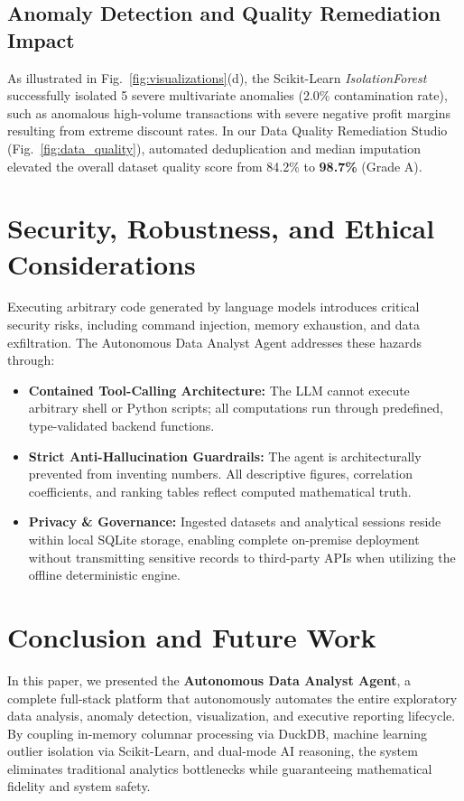\documentclass[10pt,journal,compsoc]{IEEEtran}
\begin{document}
\subsection{Anomaly Detection and Quality Remediation Impact}
As illustrated in Fig.~\ref{fig:visualizations}(d), the Scikit-Learn \textit{IsolationForest} successfully isolated 5 severe multivariate anomalies (2.0\% contamination rate), such as anomalous high-volume transactions with severe negative profit margins resulting from extreme discount rates. In our Data Quality Remediation Studio (Fig.~\ref{fig:data_quality}), automated deduplication and median imputation elevated the overall dataset quality score from 84.2\% to \textbf{98.7\%} (Grade A).

\section{Security, Robustness, and Ethical Considerations}
Executing arbitrary code generated by language models introduces critical security risks, including command injection, memory exhaustion, and data exfiltration. The Autonomous Data Analyst Agent addresses these hazards through:
\begin{itemize}
    \item \textbf{Contained Tool-Calling Architecture:} The LLM cannot execute arbitrary shell or Python scripts; all computations run through predefined, type-validated backend functions.
    \item \textbf{Strict Anti-Hallucination Guardrails:} The agent is architecturally prevented from inventing numbers. All descriptive figures, correlation coefficients, and ranking tables reflect computed mathematical truth.
    \item \textbf{Privacy & Governance:} Ingested datasets and analytical sessions reside within local SQLite storage, enabling complete on-premise deployment without transmitting sensitive records to third-party APIs when utilizing the offline deterministic engine.
\end{itemize}

\section{Conclusion and Future Work}
In this paper, we presented the \textbf{Autonomous Data Analyst Agent}, a complete full-stack platform that autonomously automates the entire exploratory data analysis, anomaly detection, visualization, and executive reporting lifecycle. By coupling in-memory columnar processing via DuckDB, machine learning outlier isolation via Scikit-Learn, and dual-mode AI reasoning, the system eliminates traditional analytics bottlenecks while guaranteeing mathematical fidelity and system safety.
\end{document}
